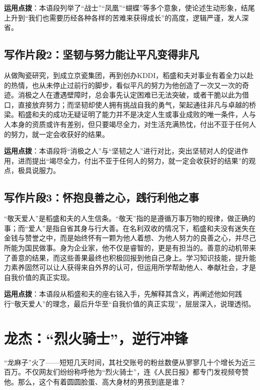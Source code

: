 \textbf{运用点拨}：本语段列举了“战士”“凤凰”“蝴蝶”等多个意象，使论述生动形象，结尾上升到“我们也需要历经各种各样的苦难来获得成长”的高度，逻辑严谨，发人深省。

\subsection*{写作片段2：坚韧与努力能让平凡变得非凡}

从做陶瓷研究，到成立京瓷集团，再到创办KDDI，稻盛和夫对事业有着全力以赴的热情，也从未停止过前行的脚步，看似平凡的努力为他创造了一次又一次的奇迹。消极之人在遭遇壁障时，总会事先认定困难已无法突破，或者干脆以此为借口，直接放弃努力；而坚韧却使人拥有挑战自我的勇气，架起通往非凡与卓越的桥梁。稻盛和夫的成功无疑证明了能力并不是决定人生或事业成败的唯一条件，人与人本身的资质或许有差别，但只要竭尽全力，对生活充满热忱，付出不亚于任何人的努力，就一定会收获好的结果。

\textbf{运用点拨}：本语段将“消极之人”与“坚韧之人”进行对比，突出坚韧对人的促进作用，进而提出“竭尽全力，付出不亚于任何人的努力，就一定会收获好的结果”的观点，极具说服力。

\subsection*{写作片段3：怀抱良善之心，践行利他之事}

“敬天爱人”是稻盛和夫的人生信条。“敬天”指的是遵循万事万物的规律，做正确的事；而“爱人”是指自省其身与行大善。在名利双收的情况下，稻盛和夫没有迷失在金钱与赞誉之中，而是始终怀有一颗为他人着想、为他人努力的良善之心，并尽己所能为国民做事。身为企业家，他不仅是睿智的，更是有担当的。善意的动机带来了善意的结果，而这些善果最终也积极回报到他自己身上。学习知识技能，提升能力素养固然可以让人获得来自外界的认可，但运用所学帮助他人、奉献社会，才是自我价值的真正实现。

\textbf{运用点拨}：本语段从稻盛和夫的座右铭入手，先解释其含义，再阐述他如何践行“敬天爱人”的理念，最后升华至“自我价值的真正实现”，层层深入，说理透彻。

\clearpage
\section*{龙杰：“烈火骑士”，逆行冲锋}

“龙麻子”火了——短短几天时间，其社交账号的粉丝数便从寥寥几十个增长为近三百万。不仅网友们纷纷称呼他为“烈火骑士”，连《人民日报》都专门发视频夸赞他。那么，这个有着圆圆脸蛋、高大身材的男孩到底是谁？

